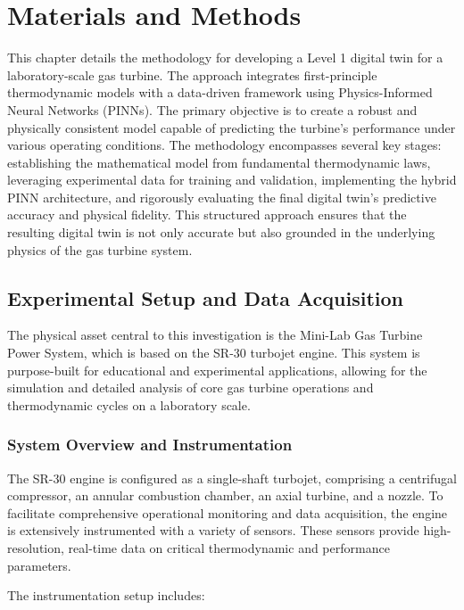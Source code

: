 \documentclass[
  12pt,
  oneside,
  a4paper,
  english,
  brazil]{abntex2}
\author{}
\date{}
\begin{document}
\chapter{\textbf{Materials and Methods}}

This chapter details the methodology for developing a Level 1 digital
twin for a laboratory-scale gas turbine. The approach integrates
first-principle thermodynamic models with a data-driven framework using
Physics-Informed Neural Networks (PINNs). The primary objective is to
create a robust and physically consistent model capable of predicting
the turbine's performance under various operating conditions. The
methodology encompasses several key stages: establishing the
mathematical model from fundamental thermodynamic laws, leveraging
experimental data for training and validation, implementing the hybrid
PINN architecture, and rigorously evaluating the final digital twin's
predictive accuracy and physical fidelity. This structured approach
ensures that the resulting digital twin is not only accurate but also
grounded in the underlying physics of the gas turbine system.

\section{Experimental Setup and Data
Acquisition}\label{experimental-setup-and-data-acquisition}

The physical asset central to this investigation is the Mini-Lab Gas
Turbine Power System, which is based on the SR-30 turbojet engine. This
system is purpose-built for educational and experimental applications,
allowing for the simulation and detailed analysis of core gas turbine
operations and thermodynamic cycles on a laboratory scale.

\subsection{System Overview and
Instrumentation}\label{system-overview-and-instrumentation}

The SR-30 engine is configured as a single-shaft turbojet, comprising a
centrifugal compressor, an annular combustion chamber, an axial turbine,
and a nozzle. To facilitate comprehensive operational monitoring and
data acquisition, the engine is extensively instrumented with a variety
of sensors. These sensors provide high-resolution, real-time data on
critical thermodynamic and performance parameters.

The instrumentation setup includes:
\end{document}
